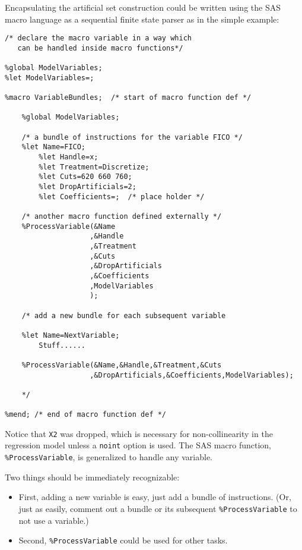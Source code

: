 \documentclass[10pt]{article}
\begin{document}
Encapsulating the artificial set construction could be written using the SAS macro language as a
sequential finite state parser as in the simple example:
\begin{Verbatim}[fontsize=\small,baselinestretch=0.75,formatcom=\color{red}]
/* declare the macro variable in a way which 
   can be handled inside macro functions*/

%global ModelVariables;
%let ModelVariables=;

%macro VariableBundles;  /* start of macro function def */

    %global ModelVariables;

    /* a bundle of instructions for the variable FICO */
    %let Name=FICO;
        %let Handle=x;
        %let Treatment=Discretize;
        %let Cuts=620 660 760;
        %let DropArtificials=2;
        %let Coefficients=;  /* place holder */
    
    /* another macro function defined externally */
    %ProcessVariable(&Name
                    ,&Handle
                    ,&Treatment
                    ,&Cuts
                    ,&DropArtificials
                    ,&Coefficients
                    ,ModelVariables
                    );
    
    /* add a new bundle for each subsequent variable 

    %let Name=NextVariable;
        Stuff......
    
    %ProcessVariable(&Name,&Handle,&Treatment,&Cuts
                    ,&DropArtificials,&Coefficients,ModelVariables);

    */

%mend; /* end of macro function def */
\end{Verbatim}
Notice that \verb+X2+ was dropped, which is necessary for non-collinearity in the regression model unless a \verb+noint+ option is used.
The SAS macro function, \verb+%ProcessVariable+, is generalized to handle any variable.

Two things should be immediately recognizable: 
\begin{itemize}
\item First, adding a new variable is easy, just add a bundle of instructions. (Or,
just as easily, comment out a bundle or its subsequent \verb+%ProcessVariable+ to not use a variable.) 
\item Second, \verb+%ProcessVariable+ could be used for other tasks. 
\end{itemize}
\end{document}
